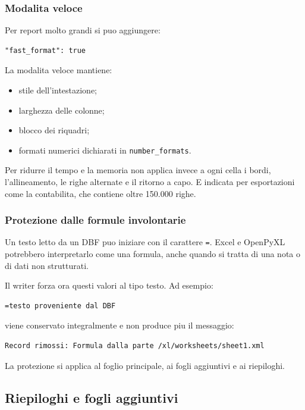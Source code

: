 \subsubsection{Modalita veloce}

Per report molto grandi si puo aggiungere:

\begin{lstlisting}
"fast_format": true
\end{lstlisting}

La modalita veloce mantiene:

\begin{itemize}
  \item stile dell'intestazione;
  \item larghezza delle colonne;
  \item blocco dei riquadri;
  \item formati numerici dichiarati in \texttt{number\_formats}.
\end{itemize}

Per ridurre il tempo e la memoria non applica invece a ogni cella i bordi,
l'allineamento, le righe alternate e il ritorno a capo. E indicata per
esportazioni come la contabilita, che contiene oltre 150.000 righe.

\subsubsection{Protezione dalle formule involontarie}

Un testo letto da un DBF puo iniziare con il carattere \texttt{=}. Excel e
OpenPyXL potrebbero interpretarlo come una formula, anche quando si tratta di
una nota o di dati non strutturati.

Il writer forza ora questi valori al tipo testo. Ad esempio:

\begin{lstlisting}
=testo proveniente dal DBF
\end{lstlisting}

viene conservato integralmente e non produce piu il messaggio:

\begin{lstlisting}
Record rimossi: Formula dalla parte /xl/worksheets/sheet1.xml
\end{lstlisting}

La protezione si applica al foglio principale, ai fogli aggiuntivi e ai
riepiloghi.

\subsection{Riepiloghi e fogli aggiuntivi}

